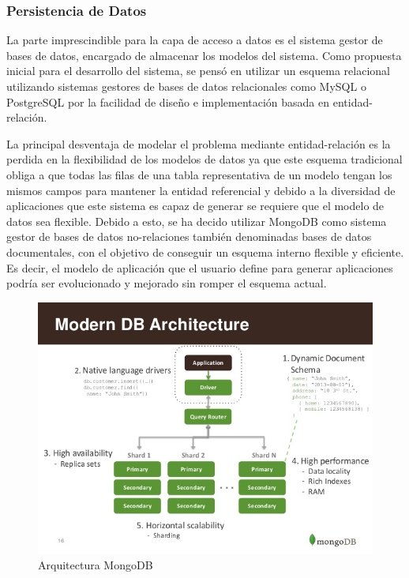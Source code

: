 \documentclass[a4paper,11pt]{book}
\begin{document}
\subsubsection{Persistencia de Datos}

La parte imprescindible para la capa de acceso a datos es el sistema gestor de bases de datos, encargado de almacenar los modelos del sistema. Como propuesta inicial para el desarrollo del sistema, se pensó en utilizar un esquema relacional utilizando sistemas gestores de bases de datos relacionales como MySQL o PostgreSQL  por la facilidad de diseño e implementación basada en entidad-relación.

La principal desventaja de modelar el problema mediante entidad-relación es la perdida en la flexibilidad de los modelos de datos ya que este esquema tradicional obliga a que todas las filas de una tabla representativa de un modelo tengan los mismos campos para mantener la entidad referencial y debido a la diversidad de aplicaciones que este sistema es capaz de generar se requiere que el modelo de datos sea flexible. Debido a esto, se ha decido utilizar MongoDB\cite{mg} como sistema gestor de bases de datos no-relaciones también denominadas bases de datos documentales, con el objetivo de conseguir un esquema interno flexible y eficiente. Es decir, el modelo de aplicación que el usuario define para generar aplicaciones podría ser evolucionado y mejorado sin romper el esquema actual. 

\begin{figure}[H]
\centering
\includegraphics[scale=0.30]{imagenes/mongo.jpg}
\caption{ Arquitectura MongoDB\cite{mongoA}  }
\end{figure}
\end{document}
